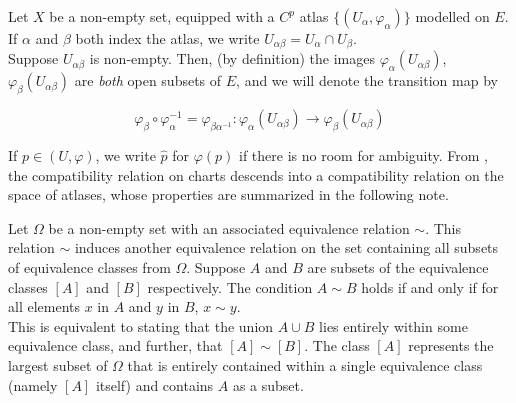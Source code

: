 \documentclass[../main-manifolds.tex]{subfiles}
\begin{document}
Let $X$ be a non-empty set, equipped with a $C^p$ atlas $\{(U_\alpha,\varphi_\alpha)\}$ modelled on $E$. If $\alpha$ and $\beta$ both index the atlas, we write  $U_{\alpha\beta} = U_{\alpha}\cap U_{\beta}$.\\

Suppose $U_{\alpha\beta}$ is non-empty. Then, (by definition) the images $\varphi_{\alpha}(U_{\alpha\beta})$, $\varphi_{\beta}(U_{\alpha\beta})$ are \emph{both} open subsets of $E$, and we will denote the transition map by

\begin{equation}\label{def-transition-map}
    \varphi_{\beta}\circ\varphi_{\alpha}^{-1}=\varphi_{\beta\alpha^{-1}}: \varphi_{\alpha}(U_{\alpha\beta})\to\varphi_{\beta}(U_{\alpha\beta})
\end{equation}

If $p\in (U,\varphi)$, we write $\hat{p}$ for $\varphi(p)$ if there is no room for ambiguity. From , the compatibility relation on charts descends into a compatibility relation on the space of atlases, whose properties are summarized in the following note.

\begin{note}\label{note:equivalence-relation-descends}
    Let \( \Omega \) be a non-empty set with an associated equivalence relation \( \sim \). This relation \( \sim \) induces another equivalence relation on the set containing all subsets of equivalence classes from \( \Omega \). Suppose \( A \) and \( B \) are subsets of the equivalence classes \( [A] \) and \( [B] \) respectively. The condition \( A \sim B \) holds if and only if for all elements \( x \) in \( A \) and \( y \) in \( B \), \( x \sim y \).\\
    
     This is equivalent to stating that the union \( A \cup B \) lies entirely within some equivalence class, and further, that \( [A] \sim [B] \). The class \( [A] \) represents the largest subset of \( \Omega \) that is entirely contained within a single equivalence class (namely $[A]$ itself) and contains $A$ as a subset.
\end{note}
\end{document}
